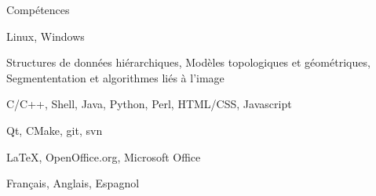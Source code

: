 \begin{rubric}{Compétences}

  
  \entry*[Systèmes]%
  Linux, Windows
  
  \entry*[Image]%
  Structures de données hiérarchiques, Modèles topologiques et géométriques, Segmententation et algorithmes liés à l'image

  \entry*[Langages]%
  C/C++, Shell, Java, Python, Perl, HTML/CSS, Javascript
  
  \entry*[Outils]%
  Qt, CMake, git, svn

  \entry*[Bureautique]%
  \LaTeX{}, OpenOffice.org, Microsoft Office

  
  \entry*[]%
  Français, Anglais, Espagnol
  
\end{rubric}
